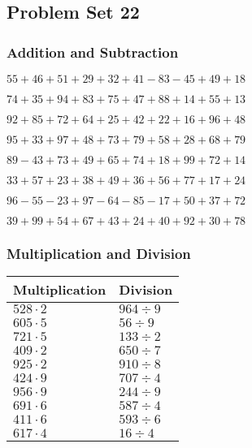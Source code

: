 \hypertarget{problem-set-22}{%
\subsection{Problem Set 22}\label{problem-set-22}}

\hypertarget{addition-and-subtraction}{%
\subsubsection{Addition and
Subtraction}\label{addition-and-subtraction}}

\(55+46+51+29+32+41-83-45+49+18\)

\(74+35+94+83+75+47+88+14+55+13\)

\(92+85+72+64+25+42+22+16+96+48\)

\(95+33+97+48+73+79+58+28+68+79\)

\(89-43+73+49+65+74+18+99+72+14\)

\(33+57+23+38+49+36+56+77+17+24\)

\(96-55-23+97-64-85-17+50+37+72\)

\(39+99+54+67+43+24+40+92+30+78\)

\hypertarget{multiplication-and-division}{%
\subsubsection{Multiplication and
Division}\label{multiplication-and-division}}

\begin{longtable}[]{@{}ll@{}}
\toprule
Multiplication & Division\tabularnewline
\midrule
\endhead
\(528\cdot2\) & \(964÷9\)\tabularnewline
\(605\cdot5\) & \(56÷9\)\tabularnewline
\(721\cdot5\) & \(133÷2\)\tabularnewline
\(409\cdot2\) & \(650÷7\)\tabularnewline
\(925\cdot2\) & \(910÷8\)\tabularnewline
\(424\cdot9\) & \(707÷4\)\tabularnewline
\(956\cdot9\) & \(244÷9\)\tabularnewline
\(691\cdot6\) & \(587÷4\)\tabularnewline
\(411\cdot6\) & \(593÷6\)\tabularnewline
\(617\cdot4\) & \(16÷4\)\tabularnewline
\bottomrule
\end{longtable}
